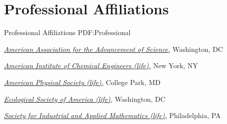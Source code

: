 \section
{Professional Affiliations}
{Professional Affiliations}
{PDF:Professional}

\href{http://www.aaas.org/}
{\textit{American Association for the Advancement of Science,}}
Washington, DC

\Gap
\href{http://www.aiche.org/}
{\textit{American Institute of Chemical Engineers (life),}}
New York, NY

\Gap
\href{http://www.aps.org/}
{\textit{American Physical Society (life),}}
College Park, MD

\Gap
\href{http://www.esa.org/esa/}
{\textit{Ecological Society of America (life),}}
Washington, DC

\Gap
\href{http://siam.org/}
{\textit{Society for Industrial and Applied Mathematics (life),}}
Philadelphia, PA

\Gap
\vspace*{0.2cm}
